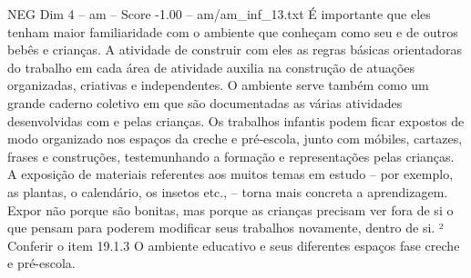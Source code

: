 \begin{textsample}{NEG Dim 4 – am – Score -1.00 – am/am\_inf\_13.txt}
É importante que eles tenham maior familiaridade com o ambiente que conheçam como seu e de outros bebês e crianças.
A atividade de construir com eles as regras básicas orientadoras do trabalho em cada área de atividade auxilia na construção de atuações organizadas, criativas e independentes.
O ambiente serve também como um grande caderno coletivo em que são documentadas as várias atividades desenvolvidas com e pelas crianças.
Os trabalhos infantis podem ficar expostos de modo organizado nos espaços da creche e pré-escola, junto com móbiles, cartazes, frases e construções, testemunhando a formação e representações pelas crianças.
A exposição de materiais referentes aos muitos temas em estudo – por exemplo, as plantas, o calendário, os insetos etc., – torna mais concreta a aprendizagem.
Expor não porque são bonitas, mas porque as crianças precisam ver fora de si o que pensam para poderem modificar seus trabalhos novamente, dentro de si. ² Conferir o item 19.1.3 O ambiente educativo e seus diferentes espaços fase creche e pré-escola.

\end{textsample}
